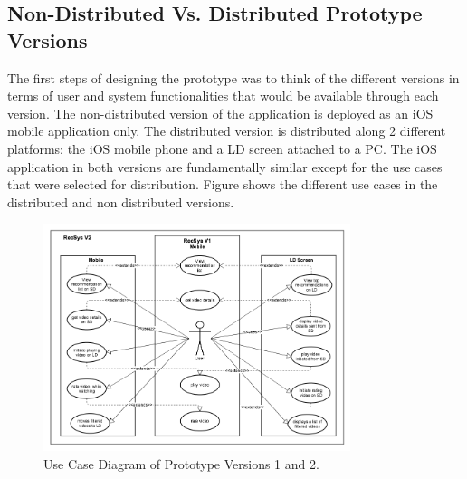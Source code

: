 \subsection{Non-Distributed Vs. Distributed Prototype Versions}
The first steps of designing the prototype was to think of the different versions in terms of user and system functionalities that would be available through each version.
The non-distributed version of the application is deployed as an iOS mobile application only. The distributed version is distributed along 2 different platforms: the iOS mobile phone and a LD screen attached to a PC. The iOS application in both versions are fundamentally similar except for the use cases that were selected for distribution. Figure shows the different use cases in the distributed and non distributed versions.
\begin{figure}[h]
\includegraphics[width=0.8\textwidth, inner, center]{figures/usecase}
\caption{Use Case Diagram of Prototype Versions 1 and 2.}
\label{fig:figure42}
\end{figure}
